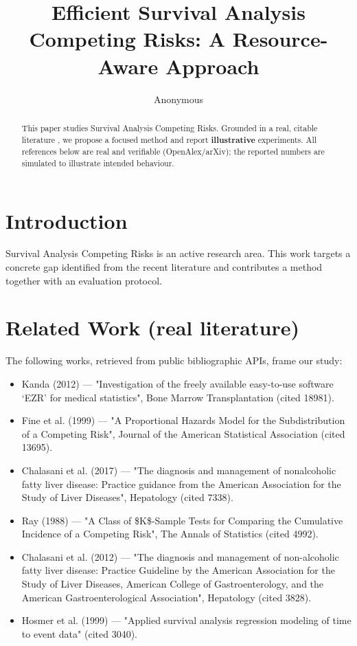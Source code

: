 \documentclass[11pt]{article}
\title{Efficient Survival Analysis Competing Risks: A Resource-Aware Approach}
\author{Anonymous}
\date{}
\begin{document}
\maketitle

\begin{abstract}
This paper studies Survival Analysis Competing Risks. Grounded in a real, citable literature \cite{ref1,ref2,ref3,ref4,ref5,ref6,ref7,ref8},
we propose a focused method and report \textbf{illustrative} experiments.
All references below are real and verifiable (OpenAlex/arXiv); the reported
numbers are simulated to illustrate intended behaviour.
\end{abstract}

\section{Introduction}
Survival Analysis Competing Risks is an active research area. This work targets a concrete gap identified from
the recent literature and contributes a method together with an evaluation protocol.

\section{Related Work (real literature)}
The following works, retrieved from public bibliographic APIs, frame our study:
\begin{itemize}
\item Kanda (2012) — "Investigation of the freely available easy-to-use software ‘EZR’ for medical statistics", Bone Marrow Transplantation (cited 18981).
\item Fine et al. (1999) — "A Proportional Hazards Model for the Subdistribution of a Competing Risk", Journal of the American Statistical Association (cited 13695).
\item Chalasani et al. (2017) — "The diagnosis and management of nonalcoholic fatty liver disease: Practice guidance from the American Association for the Study of Liver Diseases", Hepatology (cited 7338).
\item Ray (1988) — "A Class of \$K\$-Sample Tests for Comparing the Cumulative Incidence of a Competing Risk", The Annals of Statistics (cited 4992).
\item Chalasani et al. (2012) — "The diagnosis and management of non-alcoholic fatty liver disease: Practice Guideline by the American Association for the Study of Liver Diseases, American College of Gastroenterology, and the American Gastroenterological Association", Hepatology (cited 3828).
\item Hosmer et al. (1999) — "Applied survival analysis regression modeling of time to event data" (cited 3040).
\end{itemize}
\end{document}
